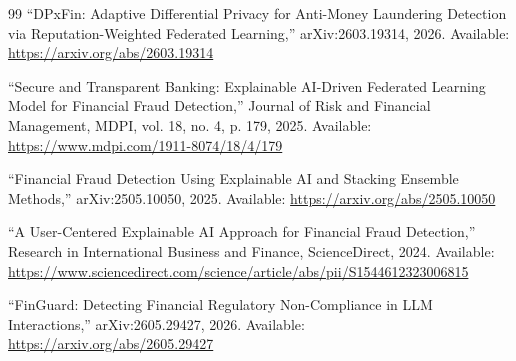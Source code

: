 \begin{thebibliography}{99}
``DPxFin: Adaptive Differential Privacy for Anti-Money Laundering Detection via Reputation-Weighted Federated Learning,'' arXiv:2603.19314, 2026. Available: \url{https://arxiv.org/abs/2603.19314}

``Secure and Transparent Banking: Explainable AI-Driven Federated Learning Model for Financial Fraud Detection,'' Journal of Risk and Financial Management, MDPI, vol. 18, no. 4, p. 179, 2025. Available: \url{https://www.mdpi.com/1911-8074/18/4/179}

``Financial Fraud Detection Using Explainable AI and Stacking Ensemble Methods,'' arXiv:2505.10050, 2025. Available: \url{https://arxiv.org/abs/2505.10050}

``A User-Centered Explainable AI Approach for Financial Fraud Detection,'' Research in International Business and Finance, ScienceDirect, 2024. Available: \url{https://www.sciencedirect.com/science/article/abs/pii/S1544612323006815}

``FinGuard: Detecting Financial Regulatory Non-Compliance in LLM Interactions,'' arXiv:2605.29427, 2026. Available: \url{https://arxiv.org/abs/2605.29427}

\end{thebibliography}
